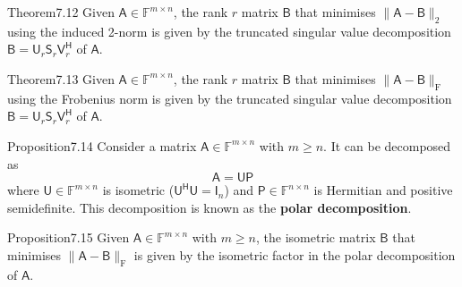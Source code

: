 \begin{res}{Theorem}{7.12}
Given $\mathsf A\in\mathbb F^{m\times n}$, the rank $r$ matrix $\mathsf B$ that minimises $\|\mathsf A-\mathsf B\|_2$ using the induced 2-norm is given by the truncated singular value decomposition $\mathsf B=\mathsf U_r\mathsf S_r\mathsf V_r^{\mathsf H}$ of $\mathsf A$.
\end{res}

\begin{res}{Theorem}{7.13}
Given $\mathsf A\in\mathbb F^{m\times n}$, the rank $r$ matrix $\mathsf B$ that minimises $\|\mathsf A-\mathsf B\|_{\mathrm F}$ using the Frobenius norm is given by the truncated singular value decomposition $\mathsf B=\mathsf U_r\mathsf S_r\mathsf V_r^{\mathsf H}$ of $\mathsf A$.
\end{res}

\begin{res}{Proposition}{7.14}
Consider a matrix $\mathsf A\in\mathbb F^{m\times n}$ with $m\ge n$. It can be decomposed as
\begin{equation}\mathsf A=\mathsf{UP}\tag{7.17}\end{equation}
where $\mathsf U\in\mathbb F^{m\times n}$ is isometric ($\mathsf U^{\mathsf H}\mathsf U=\mathsf I_n$) and $\mathsf P\in\mathbb F^{n\times n}$ is Hermitian and positive semidefinite. This decomposition is known as the \textbf{polar decomposition}.
\end{res}

\begin{res}{Proposition}{7.15}
Given $\mathsf A\in\mathbb F^{m\times n}$ with $m\ge n$, the isometric matrix $\mathsf B$ that minimises $\|\mathsf A-\mathsf B\|_{\mathrm F}$ is given by the isometric factor in the polar decomposition of $\mathsf A$.
\end{res}
